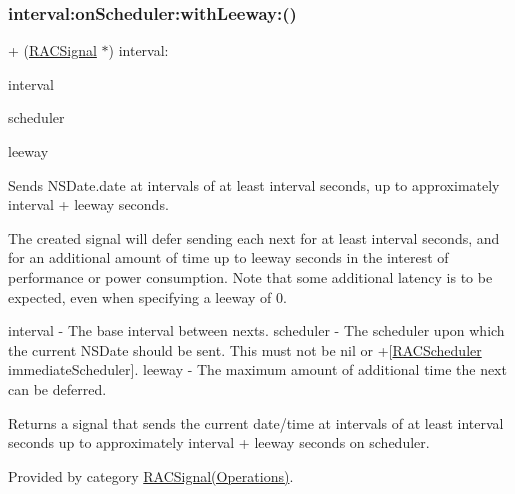 \subsubsection{\texorpdfstring{interval\+:on\+Scheduler\+:with\+Leeway\+:()}{interval:onScheduler:withLeeway:()}\hspace{0.1cm}{\footnotesize\ttfamily [3/3]}}
{\footnotesize\ttfamily + (\mbox{\hyperlink{interface_r_a_c_signal}{R\+A\+C\+Signal}} $\ast$) interval\+: \begin{DoxyParamCaption}\item[{(N\+S\+Time\+Interval)}]{interval }\item[{onScheduler:(\mbox{\hyperlink{interface_r_a_c_scheduler}{R\+A\+C\+Scheduler}} $\ast$)}]{scheduler }\item[{withLeeway:(N\+S\+Time\+Interval)}]{leeway }\end{DoxyParamCaption}}

Sends N\+S\+Date.\+date at intervals of at least {\ttfamily interval} seconds, up to approximately {\ttfamily interval} + {\ttfamily leeway} seconds.

The created signal will defer sending each {\ttfamily next} for at least {\ttfamily interval} seconds, and for an additional amount of time up to {\ttfamily leeway} seconds in the interest of performance or power consumption. Note that some additional latency is to be expected, even when specifying a {\ttfamily leeway} of 0.

interval -\/ The base interval between {\ttfamily next}s. scheduler -\/ The scheduler upon which the current N\+S\+Date should be sent. This must not be nil or +\mbox{[}\mbox{\hyperlink{interface_r_a_c_scheduler}{R\+A\+C\+Scheduler}} immediate\+Scheduler\mbox{]}. leeway -\/ The maximum amount of additional time the {\ttfamily next} can be deferred.

Returns a signal that sends the current date/time at intervals of at least {\ttfamily interval seconds} up to approximately {\ttfamily interval} + {\ttfamily leeway} seconds on {\ttfamily scheduler}. 

Provided by category \mbox{\hyperlink{category_r_a_c_signal_07_operations_08_acd968c129ec1afe3b5bc77db5fc13291}{R\+A\+C\+Signal(\+Operations)}}.

\mbox{\label{interface_r_a_c_signal_a2b970ec1845b139478ba31f00fe34b71}} 
